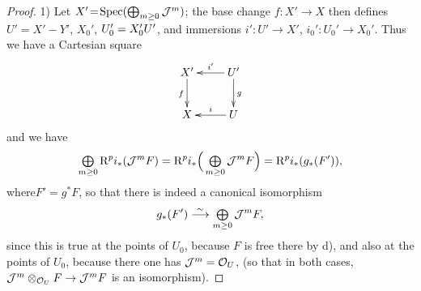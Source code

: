\begin{proof}
1) Let $X'\!=\!\operatorname{Spec}(\bigoplus_{m\geq 0}\mathcal J^m)$; the base change \hbox{$f:X'\!\to\! X$} then defines $U'=X'- Y'$, $X_0'$, $U_0'=X_0' U'$, and immersions $i':U'\to X'$, \hbox{$i_0':U_0'\to X_0'$}. Thus we have a Cartesian square
\[
\xymatrix{
X'\ar[d]_f&\ar[l]_-{i'} U'\ar[d]^g \\
X&\ar[l]_-{i} U
}
\]
and we have
\steco
\begin{equation} \label{eq:XII.19}
\mathop{\textstyle\bigoplus}\limits_{m\geq 0}\mathrm R^pi_\ast(\mathcal J^mF) = \mathrm R^pi_\ast \Big(\mathop{\textstyle\bigoplus}\limits_{m\geq 0} \mathcal J^mF \Big) =\mathrm R^pi_\ast (g_\ast(F')),
\end{equation}
where\pageoriginale $F'=g^\ast F$, so that there is indeed a canonical isomorphism
\[
g_\ast(F') \overset{\sim}{\longrightarrow} \mathop{\textstyle\bigoplus}\limits_{m\geq 0}\mathcal J^mF,
\]
since this is true at the points of $U_0$, because $F$ is free there by d), and also at the points of $U_0$, because there one has $\mathcal J^m=\mathcal O_U$, (so that in both cases, $\mathcal J^m\otimes_{\mathcal O_U}F\to \mathcal J^mF$ is an isomorphism).


\end{proof}
